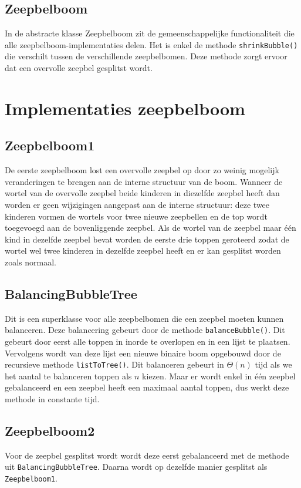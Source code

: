 \documentclass[12pt]{article}
\begin{document}
    \subsection{Zeepbelboom}
    In de abstracte klasse Zeepbelboom zit de gemeenschappelijke functionaliteit die
    alle zeepbelboom-implementaties delen. Het is enkel de methode {\tt shrinkBubble()}
    die verschilt tussen de verschillende zeepbelbomen. Deze methode zorgt ervoor dat een 
    overvolle zeepbel gesplitst wordt.

    \section{Implementaties zeepbelboom}
    \subsection{Zeepbelboom1}
    De eerste zeepbelboom  lost een overvolle zeepbel op door zo weinig mogelijk
    veranderingen te brengen aan de interne structuur van de boom. Wanneer de wortel van
    de overvolle zeepbel beide kinderen in diezelfde zeepbel heeft dan worden er geen
    wijzigingen aangepast aan de interne structuur: deze twee kinderen vormen de wortels
    voor twee nieuwe zeepbellen en de top wordt toegevoegd aan de bovenliggende zeepbel.
    Als de wortel van de zeepbel maar één kind in dezelfde zeepbel bevat worden de
    eerste drie toppen geroteerd zodat de wortel wel twee kinderen in dezelfde zeepbel
    heeft en er kan gesplitst worden zoals normaal.
    \subsection{BalancingBubbleTree}
    Dit is een superklasse voor alle zeepbelbomen die een zeepbel moeten kunnen balanceren.
    Deze balancering gebeurt door de methode {\tt balanceBubble()}. Dit gebeurt door eerst 
    alle toppen in inorde te overlopen en in een lijst te plaatsen.
    Vervolgens wordt van deze lijst een nieuwe binaire boom opgebouwd door de recursieve
    methode {\tt listToTree()}. Dit balanceren gebeurt in $\Theta (n)$ tijd als we het
    aantal te balanceren toppen als $n$ kiezen. Maar er wordt enkel in één zeepbel
    gebalanceerd en een zeepbel heeft een maximaal aantal toppen, dus werkt deze methode
    in constante tijd.   
    \subsection{Zeepbelboom2}
    Voor de zeepbel gesplitst wordt wordt deze eerst gebalanceerd met de methode
    uit {\tt BalancingBubbleTree}. Daarna wordt op dezelfde manier gesplitst als
    {\tt Zeepbelboom1}.
\end{document}
